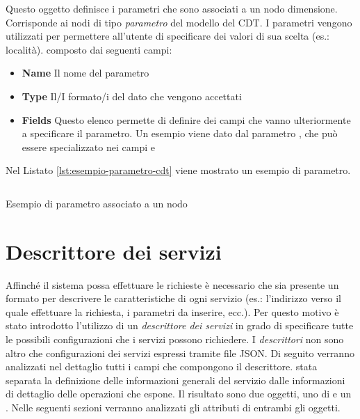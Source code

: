 Questo oggetto definisce i parametri che sono associati a un nodo dimensione. Corrisponde ai nodi di tipo \emph{parametro} del modello del CDT. I parametri vengono utilizzati per permettere all'utente di specificare dei valori di sua scelta (es.: località). \upe composto dai seguenti campi:

\begin{itemize}
	\item \textbf{Name}
	Il nome del parametro
	\item \textbf{Type}
	Il/I formato/i del dato che vengono accettati
	\item \textbf{Fields}
	Questo elenco permette di definire dei campi che vanno ulteriormente a specificare il parametro. Un esempio viene dato dal parametro , che può essere specializzato nei campi  e 
\end{itemize}

Nel Listato \ref{lst:esempio-parametro-cdt} viene mostrato un esempio di parametro.

\begin{listing}[H]
	\inputminted{json}{5-implementazione-backend/Codice/esempio_parametro_cdt.json}
	\caption{Esempio di parametro associato a un nodo}
	\label{lst:esempio-parametro-cdt}
\end{listing}

\section{Descrittore dei servizi\label{sec:descrittore-servizi}}

Affinché il sistema possa effettuare le richieste è necessario che sia presente un formato per descrivere le caratteristiche di ogni servizio (es.: l'indirizzo verso il quale effettuare la richiesta, i parametri da inserire, ecc.). Per questo motivo è stato introdotto l'utilizzo di un \emph{descrittore dei servizi} in grado di specificare tutte le possibili configurazioni che i servizi possono richiedere. I \emph{descrittori} non sono altro che configurazioni dei servizi espressi tramite file JSON. Di seguito verranno analizzati nel dettaglio tutti i campi che compongono il descrittore. \upe stata separata la definizione delle informazioni generali del servizio dalle informazioni di dettaglio delle operazioni che espone. Il risultato sono due oggetti, uno di  e un . Nelle seguenti sezioni verranno analizzati gli attributi di entrambi gli oggetti.

